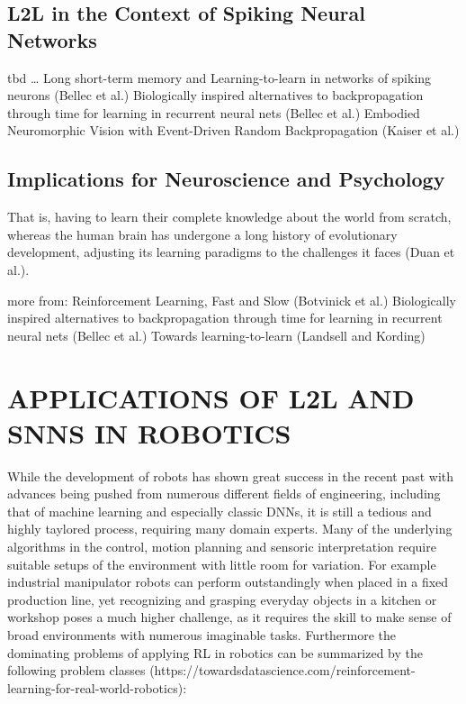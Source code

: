 \documentclass[letterpaper, 10 pt, conference]{ieeeconf}  %
\begin{document}
\subsection{L2L in the Context of Spiking Neural Networks}

tbd \dots
Long short-term memory and Learning-to-learn in networks of spiking neurons (Bellec et al.)
Biologically inspired alternatives to backpropagation through time for learning in recurrent neural nets (Bellec et al.)
Embodied Neuromorphic Vision with Event-Driven Random Backpropagation (Kaiser et al.)

\subsection{Implications for Neuroscience and Psychology}
That is, having to learn their complete knowledge about the world from scratch, whereas the human brain has undergone a long history of evolutionary
development, adjusting its learning paradigms to the challenges it faces (Duan et al.). \newline

more from: \newline
Reinforcement Learning, Fast and Slow (Botvinick et al.) \newline
Biologically inspired alternatives to backpropagation through time for learning in recurrent neural nets (Bellec et al.) \newline
Towards learning-to-learn (Landsell and Kording) \newline

\section{APPLICATIONS OF L2L AND SNNS IN ROBOTICS}

While the development of robots has shown great success in the recent past with advances being pushed from 
numerous different fields of engineering, including that of machine learning and especially classic 
DNNs, it is still a tedious and highly taylored process, requiring many domain experts. Many of the underlying algorithms in 
the control, motion planning and sensoric interpretation require suitable setups of the environment with little room
for variation. For example industrial manipulator robots can perform outstandingly when placed in a fixed production line, yet 
recognizing and grasping everyday objects in a kitchen or workshop poses a much higher challenge, as it requires the skill to 
make sense of broad environments with numerous imaginable tasks. Furthermore the dominating problems of applying RL in 
robotics can be summarized by the following problem classes (https://towardsdatascience.com/reinforcement-learning-for-real-world-robotics):
\end{document}
